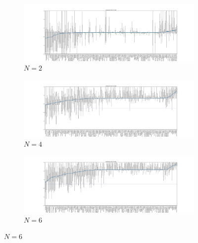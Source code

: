 \documentclass{article}
\begin{document}
\begin{figure}[!hbtp]
    \centering
    \begin{subfigure}[t]{\textwidth}
        \centering
        \includegraphics[width=\textwidth]{../img/resistance_boxplot_2_std.pdf}
        \caption{\(N=2\)}
    \end{subfigure}%

    \begin{subfigure}[t]{\textwidth}
        \centering
        \includegraphics[width=\textwidth]{../img/resistance_boxplot_4_std.pdf}
        \caption{\(N=4\)}
    \end{subfigure}%

    \begin{subfigure}[t]{\textwidth}
        \centering
        \includegraphics[width=\textwidth]{../img/resistance_boxplot_6_std.pdf}
        \caption{\(N=6\)}
    \end{subfigure}%



\end{figure}
\end{document}

